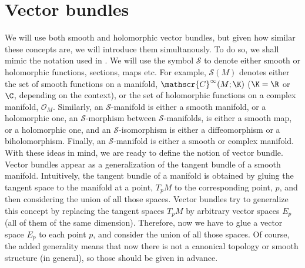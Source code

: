 \section{Vector bundles}
We will use both smooth and holomorphic vector bundles, but given how similar these concepts are, we will introduce them simultanously. To do so, we shall mimic the notation used in \parencite{garcia2007differential}. We will use the symbol \(\mathcal{S}\) to denote either smooth or holomorphic functions, sections, maps etc. For example, \(\mathcal{S}(M)\) denotes either the set of smooth functions on a manifold, \(\mathscr{C}^\infty(M;\K)\) (\(\K=\R\) or \(\C\), depending on the context), or the set of holomorphic functions on a complex manifold, \(\mathcal{O}_M\). Similarly, an \(\mathcal{S}\)-manifold is either a smooth manifold, or a holomorphic one, an \(\mathcal{S}\)-morphism between \(\mathcal{S}\)-manifolds, is either a smooth map, or a holomorphic one, and an \(\mathcal{S}\)-isomorphism is either a diffeomorphism or a biholomorphism. Finally, an \(\mathcal{S}\)-manifold is either a smooth or complex manifold. \\

With these ideas in mind, we are ready to define the notion of vector bundle. Vector bundles appear as a generalization of the tangent bundle of a smooth manifold. Intuitively, the tangent bundle of a manifold is obtained by gluing the tangent space to the manifold at a point, \(T_pM\) to the corresponding point, \(p\), and then considering the union of all those spaces. Vector bundles try to generalize this concept by replacing the tangent spaces \(T_pM\) by arbitrary vector spaces \(E_p\) (all of them of the same dimension). Therefore, now we have to glue a vector space \(E_p\) to each point \(p\), and consider the union of all those spaces. Of course, the added generality means that now there is not a canonical topology or smooth structure (in general), so those should be given in advance. \\

